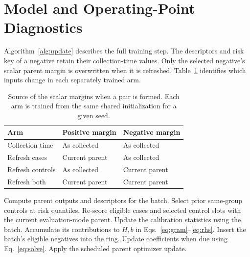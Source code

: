 \documentclass{article}
\begin{document}
\clearpage
\section{Model and Operating-Point Diagnostics}
Algorithm~\ref{alg:update} describes the full training step. The descriptors and risk key of a negative retain their collection-time values. Only the selected negative's scalar parent margin is overwritten when it is refreshed. Table~\ref{tab:arms} identifies which inputs change in each separately trained arm.
\begin{table}[htbp]\centering\small
\caption{Source of the scalar margins when a pair is formed. Each arm is trained from the same shared initialization for a given seed.}\label{tab:arms}
\begin{tabular}{lll}\toprule
Arm & Positive margin & Negative margin\\\midrule
Collection time & As collected & As collected\\
Refresh cases & Current parent & As collected\\
Refresh controls & As collected & Current parent\\
Refresh both & Current parent & Current parent\\\bottomrule
\end{tabular}
\end{table}
\begin{algorithm}[htbp]
\caption{One training batch in the full method}\label{alg:update}
\begin{algorithmic}[1]
\STATE Compute parent outputs and descriptors for the batch.
  \STATE Select prior same-group controls at risk quantiles.
\ENDFOR
\STATE Re-score eligible cases and selected control slots with the current evaluation-mode parent.
\STATE Update the calibration statistics using the batch.
  \STATE Accumulate its contributions to $H,b$ in Eqs.~\ref{eq:gram}--\ref{eq:rhs}.
\ENDFOR
\STATE Insert the batch's eligible negatives into the ring.
\STATE Update coefficients when due using Eq.~\ref{eq:solve}.
\STATE Apply the scheduled parent optimizer update.
\end{algorithmic}
\end{algorithm}
\end{document}
